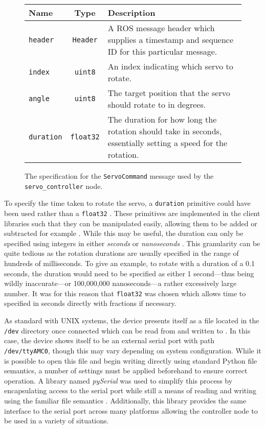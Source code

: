 \begin{figure}[h]
	\centering
	\begin{tabular}{ l c p{10cm} }
		\textbf{Name} & \textbf{Type} & \textbf{Description} \\
		\hline

		\texttt{header} & 
		\texttt{Header}	& 
		A ROS message header which supplies a timestamp and sequence ID for this particular message. \\

		\texttt{index} & 
		\texttt{uint8} &
		 An index indicating which servo to rotate. \\
		
		\texttt{angle} & 
		\texttt{uint8} & 
		The target position that the servo should rotate to in degrees. \\
		
		\texttt{duration} &
		\texttt{float32} &
		The duration for how long the rotation should take in seconds, essentially setting a speed for the rotation. \\
	\end{tabular}
	\caption{The specification for the \texttt{ServoCommand} message used by the \texttt{servo\_controller} node.}
	\label{fig:servocommand_msg}
\end{figure}

To specify the time taken to rotate the servo, a \texttt{duration} primitive could have been used rather than a \texttt{float32} \cite{ros_wiki_msg}. These primitives are implemented in the client libraries such that they can be manipulated easily, allowing them to be added or subtracted for example \cite{ros_api_duration_msg}. While this may be useful, the duration can only be specified using integers in either \emph{seconds} or \emph{nanoseconds} \cite{ros_api_duration_msg}. This granularity can be quite tedious as the rotation durations are usually specified in the range of hundreds of milliseconds. To give an example, to rotate with a duration of a 0.1 seconds, the duration would need to be specified as either 1 second---thus being wildly inaccurate---or 100,000,000 nanoseconds---a rather excessively large number. It was for this reason that \texttt{float32} was chosen which allows time to specified in seconds directly with fractions if necessary.

As standard with UNIX systems, the device presents itself as a file located in the \texttt{/dev} directory once connected which can be read from and written to \cite{unix_devices}. In this case, the device shows itself to be an external serial port with path \texttt{/dev/ttyAMC0}, though this may vary depending on system configuration. While it is possible to open this file and begin writing directly using standard Python file semantics, a number of settings must be applied beforehand to ensure correct operation. A library named \emph{pySerial} was used to simplify this process by encapsulating access to the serial port while still a means of reading and writing using the familiar file semantics \cite{pyserial}. Additionally, this library provides the same interface to the serial port across many platforms allowing the controller node to be used in a variety of situations.

